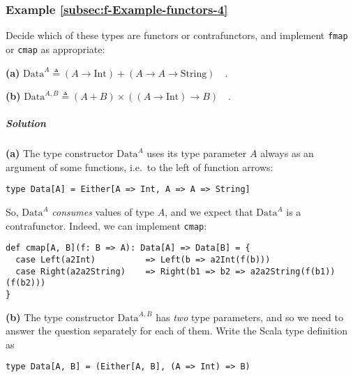 \subsubsection{Example \label{subsec:f-Example-functors-4}\ref{subsec:f-Example-functors-4}}

Decide which of these types are functors or contrafunctors, and implement
\lstinline!fmap! or \lstinline!cmap! as appropriate:

\textbf{(a)} $\text{Data}^{A}\triangleq\left(A\rightarrow\text{Int}\right)+(A\rightarrow A\rightarrow\text{String})\quad.$ 

\textbf{(b)} $\text{Data}^{A,B}\triangleq\left(A+B\right)\times\left(\left(A\rightarrow\text{Int}\right)\rightarrow B\right)\quad.$

\subparagraph{Solution}

\textbf{(a)} The type constructor $\text{Data}^{A}$ uses its type
parameter $A$ always as an argument of some functions, i.e.~to the
left of function arrows:
\begin{lstlisting}
type Data[A] = Either[A => Int, A => A => String]
\end{lstlisting}
So, $\text{Data}^{A}$ \emph{consumes} values of type $A$, and we
expect that $\text{Data}^{A}$ is a contrafunctor. Indeed, we can
implement \lstinline!cmap!:
\begin{lstlisting}
def cmap[A, B](f: B => A): Data[A] => Data[B] = {
  case Left(a2Int)          => Left(b => a2Int(f(b)))
  case Right(a2a2String)    => Right(b1 => b2 => a2a2String(f(b1))(f(b2)))
}
\end{lstlisting}

\textbf{(b)} The type constructor $\text{Data}^{A,B}$ has \emph{two}
type parameters, and so we need to answer the question separately
for each of them. Write the Scala type definition as
\begin{lstlisting}
type Data[A, B] = (Either[A, B], (A => Int) => B)
\end{lstlisting}

